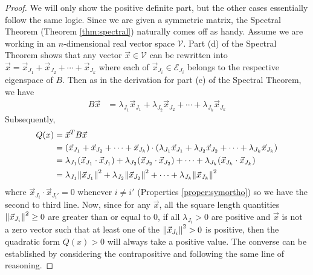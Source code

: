 \begin{proof}
We will only show the positive definite part, but the other cases essentially follow the same logic. Since we are given a symmetric matrix, the Spectral Theorem (Theorem \ref{thm:spectral}) naturally comes off as handy. Assume we are working in an $n$-dimensional real vector space $\mathcal{V}$. Part (d) of the Spectral Theorem shows that any vector $\vec{x} \in \mathcal{V}$ can be rewritten into $\vec{x} = \vec{x}_{J_1} + \vec{x}_{J_2} + \cdots + \vec{x}_{J_k}$ where each of $\vec{x}_{J_i} \in \mathcal{E}_{J_i}$ belongs to the respective eigenspace of $B$. Then as in the derivation for part (e) of the Spectral Theorem, we have
\begin{align*}
B\vec{x} &= \lambda_{J_1}\vec{x}_{J_1} + \lambda_{J_2}\vec{x}_{J_2} + \cdots + \lambda_{J_k}\vec{x}_{J_k}
\end{align*}
Subsequently,
\begin{align*}
Q(x) &= \vec{x}^T B\vec{x} \\
&= (\vec{x}_{J_1} + \vec{x}_{J_2} + \cdots + \vec{x}_{J_k}) \cdot (\lambda_{J_1}\vec{x}_{J_1} + \lambda_{J_2}\vec{x}_{J_2} + \cdots + \lambda_{J_k}\vec{x}_{J_k}) \\
&= \lambda_{J_1}(\vec{x}_{J_1} \cdot \vec{x}_{J_1}) + \lambda_{J_2}(\vec{x}_{J_2} \cdot \vec{x}_{J_2}) + \cdots + \lambda_{J_k}(\vec{x}_{J_k} \cdot \vec{x}_{J_k}) \\
&= \lambda_{J_1}\norm{\vec{x}_{J_1}}^2 + \lambda_{J_2}\norm{\vec{x}_{J_2}}^2 + \cdots + \lambda_{J_k}\norm{\vec{x}_{J_k}}^2
\end{align*}
where $\vec{x}_{J_i} \cdot \vec{x}_{J_i'} = 0$ whenever $i \neq i'$ (Properties \ref{proper:symortho}) so we have the second to third line. Now, since for any $\vec{x}$, all the square length quantities $\norm{\vec{x}_{J_i}}^2 \geq 0$ are greater than or equal to $0$, if all $\lambda_{J_i} > 0$ are positive and $\vec{x}$ is not a zero vector such that at least one of the $\norm{\vec{x}_{J_i}}^2 > 0$ is positive, then the quadratic form $Q(x) > 0$ will always take a positive value. The converse can be established by considering the contrapositive and following the same line of reasoning.
\end{proof}

